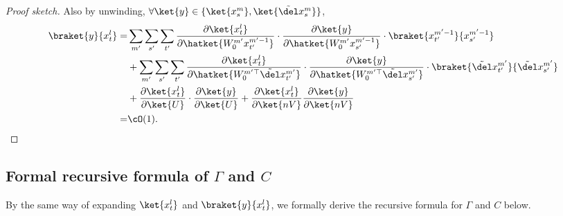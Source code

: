 \begin{proof}[Proof sketch]
Also by unwinding, $\forall \ket{y}\in \{\ket{x_s^m}, \ket{\tilde \del x_s^m}\}$,
\begin{align*}
    \braket{y}{x_t^l}= & \sum_{m'}\sum_{s'}\sum_{t'} \frac{\partial \ket{x_t^l}}{\partial \hatket{W_0^{m'}x_{t'}^{m'-1}}}\cdot \frac{\partial \ket{y}}{\partial \hatket{W_0^{m'}x_{s'}^{m'-1}}}\cdot \braket{x_{t'}^{m'-1}}{x_{s'}^{m'-1}} \\
    & + \sum_{m'}\sum_{s'}\sum_{t'}  \frac{\partial \ket{x_t^l}}{\partial \hatket{W_0^{m'\top}\tilde \del x_{t'}^{m'}}}\cdot \frac{\partial \ket{y}}{\partial \hatket{W_0^{m'\top}\tilde \del x_{s'}^{m'}}}\cdot  \braket{\tilde \del x_{t'}^{m'}}{\tilde \del x_{s'}^{m'}}  \\
    & + 
    \frac{\partial \ket{x_t^l}}{\partial \ket{U}} \cdot 
    \frac{\partial \ket{y}}{\partial \ket{U}} + 
    \frac{\partial \ket{x_t^l}}{\partial \ket{nV}}
    \frac{\partial \ket{y}}{\partial \ket{nV}} \\
    = & \cO(1). \qedhere
\end{align*}
\end{proof}

\subsection{Formal recursive formula of $\Gamma$ and $C$}
By the same way of expanding $\ket{x_t^l}$ and $\braket{y}{x_t^l}$, we formally derive the recursive formula for $\Gamma$ and $C$ below.

